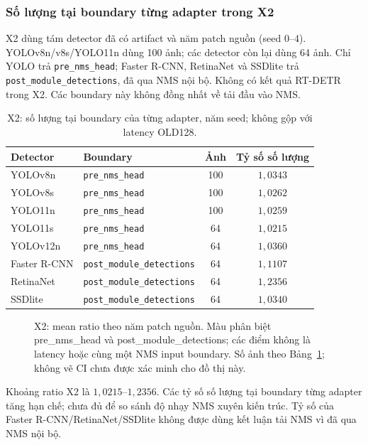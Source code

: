 \documentclass[a4paper,fleqn]{cas-dc}
\begin{document}
\subsubsection{Số lượng tại boundary từng adapter trong X2}
X2 dùng tám detector đã có artifact và năm patch nguồn (seed 0--4). YOLOv8n/v8s/YOLO11n dùng 100 ảnh; các detector còn lại dùng 64 ảnh. Chỉ YOLO trả \texttt{pre\_nms\_head}; Faster R-CNN, RetinaNet và SSDlite trả \texttt{post\_module\_\allowbreak{}detections}, đã qua NMS nội bộ. Không có kết quả RT-DETR trong X2. Các boundary này không đồng nhất về tải đầu vào NMS.
\begin{table}[t]\centering\small
\caption{X2: số lượng tại boundary của từng adapter, năm seed; không gộp với latency OLD128.}
\begin{tabularx}{\textwidth}{@{}l X c c@{}}\toprule Detector & Boundary & Ảnh & Tỷ số số lượng \\ \midrule
YOLOv8n & \texttt{pre\_nms\_head} & 100 & $1{,}0343$ \\
YOLOv8s & \texttt{pre\_nms\_head} & 100 & $1{,}0262$ \\
YOLO11n & \texttt{pre\_nms\_head} & 100 & $1{,}0259$ \\
YOLO11s & \texttt{pre\_nms\_head} & 64 & $1{,}0215$ \\
YOLOv12n & \texttt{pre\_nms\_head} & 64 & $1{,}0360$ \\
Faster R-CNN & \texttt{post\_module\_\allowbreak{}detections} & 64 & $1{,}1107$ \\
RetinaNet & \texttt{post\_module\_\allowbreak{}detections} & 64 & $1{,}2356$ \\
SSDlite & \texttt{post\_module\_\allowbreak{}detections} & 64 & $1{,}0340$ \\
\bottomrule\end{tabularx}\label{tab:x2_counts}\end{table}
\begin{figure}[t]\centering
{}
\caption{X2: mean ratio theo năm patch nguồn. Màu phân biệt pre\_nms\_head và post\_module\_detections; các điểm không là latency hoặc cùng một NMS input boundary. Số ảnh theo Bảng~\ref{tab:x2_counts}; không vẽ CI chưa được xác minh cho đồ thị này.}
\label{fig:x2_counts}\end{figure}
Khoảng ratio X2 là $1{,}0215$--$1{,}2356$. Các tỷ số số lượng tại boundary từng adapter tăng hạn chế; chưa đủ để so sánh độ nhạy NMS xuyên kiến trúc. Tỷ số của Faster R-CNN/RetinaNet/SSDlite không được dùng kết luận tải NMS vì đã qua NMS nội bộ.
\end{document}
